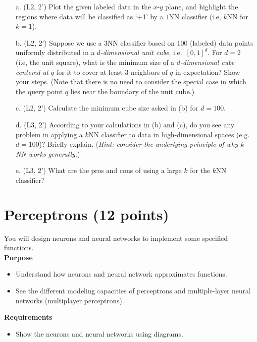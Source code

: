 \begin{enumerate}
	\item[a.] (L2, 2')  Plot the given labeled data in the $x$-$y$ plane, and highlight the regions where data will be classified as `+1' by a $1$NN classifier (i.e, $k$NN for $k=1$).

	
	\item[b.] (L2, 2') Suppose we use a $3$NN classifier based on 100 (labeled) data points uniformly distributed in a {\it $d$-dimensional unit cube}, i.e.\ $[0,1]^d$. For $d=2$ (i.e, the unit square), what is the minimum size of a {\it $d$-dimensional cube centered at $q$} for it to cover at least 3 neighbors of $q$ in expectation? Show your steps. (Note that there is no need to consider the special case in which the query point $q$ lies near the boundary of the unit cube.)

	\item[c.] (L2, 2') Calculate the minimum cube size asked in (b) for $d=100$.

	\item[d.] (L3, 2') According to your calculations in (b) and (c), do you see any problem in applying a $k$NN classifier to data in high-dimensional spaces (e.g.\ $d=100$)? Briefly explain. ({\it Hint: consider the underlying principle of why $k$NN works generally.})

	
	\item[e.] (L3, 2') What are the pros and cons of using a large $k$ for the $k$NN classifier?
\end{enumerate}



\section{Perceptrons (12 points)}
You will design neurons and neural networks to implement some specified functions.\\

\textbf{Purpose} 
\begin{itemize}
	\item Understand how neurons and neural network approximates functions.
	\item See the different modeling capacities of perceptrons and multiple-layer neural networks (multiplayer perceptrons).
\end{itemize}

\textbf{Requirements}
\begin{itemize}	
	\item Show the neurons and neural networks using diagrams.
\end{itemize}

